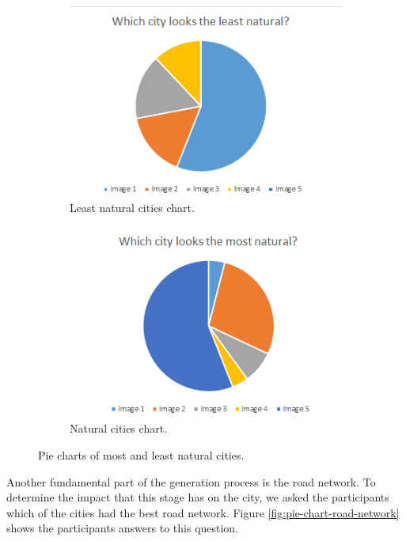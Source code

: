 \begin{figure}[h]
	\begin{subfigure}{0.5\textwidth}
		\centering
		\includegraphics[width=0.95\linewidth]{"Images/LeastNatural"}
		\caption{Least natural cities chart.}
		\label{fig:pie-chart-least-natural}
	\end{subfigure}
	\begin{subfigure}{0.5\textwidth}
		\centering
		\includegraphics[width=0.95\linewidth]{"Images/Natural"}
		\caption{Natural cities chart.}
		\label{fig:pie-chart-natural}
	\end{subfigure}
	\caption{Pie charts of most and least natural cities.}
	\label{fig:pie-chart-natural-least-natural}
\end{figure}

Another fundamental part of the generation process is the road network. To determine the impact that this stage has on the city, we asked the participants which of the cities had the best road network. Figure \ref{fig:pie-chart-road-network} shows the participants answers to this question.

